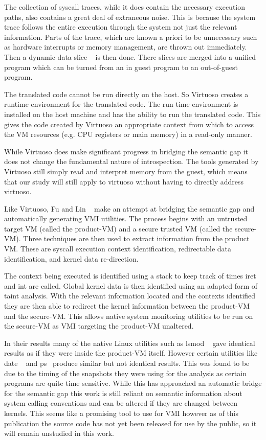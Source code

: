 The collection of syscall traces, while it does contain the necessary execution paths, also contains a great deal of extraneous noise. This is because the system trace follows the entire execution through the system not just the relevant information. Parts of the trace, which are known a priori to be unnecessary such as hardware interrupts or memory management, are thrown out immediately. Then a dynamic data slice ~\cite{agrawal_dynamic_1990} is then done. There slices are merged into a unified program which can be turned from an in guest program to an out-of-guest program. 

The translated code cannot be run directly on the host. So Virtuoso creates a runtime environment for the translated code. The run time environment is installed on the host machine and has the ability to run the translated code. This gives the code created by Virtuoso an appropriate context from which to access the VM resources (e.g. CPU registers or main memory) in a read-only manner.

While Virtuoso does make significant progress in bridging the semantic gap it does not change the fundamental nature of introspection. The tools generated by Virtuoso still simply read and interpret memory from the guest, which means that our study will still apply to virtuoso without having to directly address virtuoso. 


Like Virtuoso, Fu and Lin ~\cite{fu_bridging_2013} make an attempt at bridging the semantic gap and automatically generating VMI utilities.  The process begins with an untrusted target VM (called the product-VM) and a secure trusted VM (called the secure-VM). Three techniques are then used to extract information from the product VM. These are syscall execution context identification, redirectable data identification, and kernel data re-direction. 

The context being executed is identified using a stack to keep track of times iret  and int are called. Global kernel data is then identified using an adapted form of taint analysis. With the relevant information located and the contexts identified they are then able to redirect the kernel information between the product-VM and the secure-VM. This allows native system monitoring utilities to be run on the secure-VM as VMI targeting the product-VM unaltered. 

In their results many of the native Linux utilities such as lsmod ~\cite{kerrisk_lsmod8_2014} gave identical results as if they were inside the product-VM itself. However certain utilities like date ~\cite{mackenzie_date1_????} and ps~\cite{lankester_ps1_????} produce similar but not identical results. This was found to be due to the timing of the snapshots they were using for the analysis as certain programs are quite time sensitive. While this has approached an automatic bridge for the semantic gap this work is still reliant on semantic information about system calling conventions and can be altered if they are changed between kernels. This seems like a promising tool to use for VMI however as of this publication the source code has not yet been released for use by the public, so it will remain unstudied in this work. 


